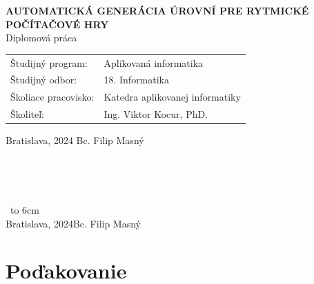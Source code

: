 \documentclass[12pt, twoside, openany]{book}
\def\mftitle{Automatická Generácia Úrovní pre Rytmické Počítačové Hry}
\def\mfthesistype{Diplomová práca}
\def\mfauthor{Bc. Filip Masný}
\def\mfskolitel{Ing. Viktor Kocur, PhD.}
\def\mfplacedate{Bratislava, 2024}
\def\mfodbor{18. Informatika}
\def\program{Aplikovaná informatika}
\def\mfpracovisko{Katedra aplikovanej informatiky}
\begin{document}
\begin{center}
    \textbf{\MakeUppercase{\Large\mftitle}}\\
    \mfthesistype
\end{center}
\vfill


\begin{tabular}{l l}
    Študijný program:    & \program      \\
    Študijný odbor:      & \mfodbor      \\
    Školiace pracovisko: & \mfpracovisko \\
    Školiteľ:            & \mfskolitel   \\
\end{tabular}

\vfill
\noindent
\mfplacedate \hfill
\mfauthor
\cleardoublepage




\newpage
\thispagestyle{empty}

\newpage
\thispagestyle{empty}




{~}\vspace{12cm}

\noindent
\begin{minipage}{0.25\textwidth}~\end{minipage}
\thispagestyle{empty}
\begin{minipage}{0.75\textwidth}
    
\end{minipage}
\vfill
~\hfill {\hbox to 6cm{\dotfill}} \\
\mfplacedate \hfill \mfauthor
\vfill\eject \cleardoublepage




\newpage
\thispagestyle{empty}
\chapter*{Poďakovanie}\label{chap:thank_you}
\end{document}
